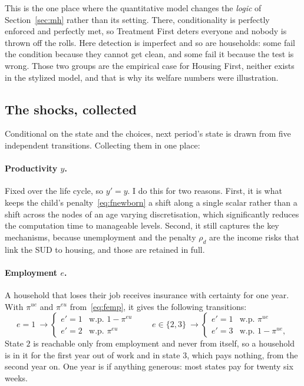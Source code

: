 \documentclass[10pt]{article}
\begin{document}
This is the one place where the quantitative model changes the \emph{logic} of
Section~\ref{sec:mh} rather than its setting. There, conditionality is perfectly
enforced and perfectly met, so Treatment First deters everyone and nobody is
thrown off the rolls. Here detection is imperfect and so are households: some fail
the condition because they cannot get clean, and some fail it because the test is
wrong. Those two groups are the empirical case for Housing First, neither exists
in the stylized model, and that is why its welfare numbers were illustration.

\subsection{The shocks, collected}\label{sec:fshocks}

Conditional on the state and the choices, next period's state is drawn from five
independent transitions. Collecting them in one place:

\paragraph{Productivity $y$.} Fixed over the life cycle, so $y'=y$.
I do this for two reasons. First, it is what keeps the child's
penalty~\eqref{eq:fnewborn} a shift
along a single scalar rather than a shift across the nodes of an age varying
discretisation, which significantly reduces the computation time to
manageable levels. Second, it still captures the key mechanisms, because
unemployment and the penalty $\rho_d$ are the income risks that link the SUD to
housing, and those are retained in full.

\paragraph{Employment $e$.} A household that loses their job receives insurance
with certainty for one year. With $\pi^{ue}$ and $\pi^{eu}$
from~\eqref{eq:femp}, it gives the following transitions:
\begin{equation}\label{eq:fetrans}
e=1\ \longrightarrow
\begin{cases}
e'=1 & \text{w.p. } 1-\pi^{eu}\\
e'=2 & \text{w.p. } \pi^{eu}
\end{cases}
\qquad
e\in\{2,3\}\ \longrightarrow
\begin{cases}
e'=1 & \text{w.p. } \pi^{ue}\\
e'=3 & \text{w.p. } 1-\pi^{ue},
\end{cases}
\end{equation}
State $2$ is reachable only from employment and never from itself, so a
household is in it for the
first year out of work and in state $3$, which pays nothing, from the second year
on. One year is if anything generous: most states pay for twenty six weeks.
\end{document}
